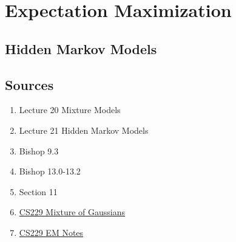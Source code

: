\documentclass[11pt, oneside]{article}   	%
\begin{document}
\section{Expectation Maximization}

\subsection{Hidden Markov Models}

\subsection{Sources}

\begin{enumerate}
	\item Lecture 20 Mixture Models
	\item Lecture 21 Hidden Markov Models
	\item Bishop 9.3
	\item Bishop 13.0-13.2
	\item Section 11
	\item \href{http://cs229.stanford.edu/notes/cs229-notes7b.pdf}{CS229 Mixture of Gaussians}
	\item \href{http://cs229.stanford.edu/notes/cs229-notes8.pdf}{CS229 EM Notes}
\end{enumerate}
\end{document}
